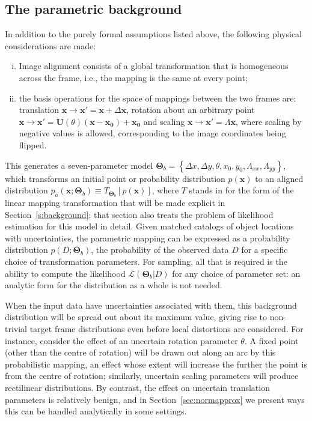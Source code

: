 \documentclass[manuscript]{aastex}
\newcommand{\bsT}{\boldsymbol\Theta}
\begin{document}
\subsection{The parametric background}\label{ss:p}
In addition to the purely formal assumptions listed above, the following physical considerations are made:
\begin{enumerate}[(i)]
\item Image alignment consists of a global transformation that is homogeneous across the frame, i.e., the mapping is the same at every point;
\item the basis operations for the space of mappings between the two frames are: translation $\mathbf{x}\rightarrow \mathbf{x}' = \mathbf{x}+\Delta\mathbf{x}$, rotation about an arbitrary point $\mathbf{x}\rightarrow \mathbf{x}' = \mathbf{U}(\theta)\left(\mathbf{x}-\mathbf{x_0}\right)+\mathbf{x_0}$ and scaling  $\mathbf{x}\rightarrow \mathbf{x}' = \Lambda\mathbf{x}$, where scaling by negative values is allowed, corresponding to the image coordinates being flipped.
\end{enumerate}
This generates a seven-parameter model $\bsT_b = \left\{\Delta x, \Delta y, \theta, x_0, y_0, \Lambda_{xx},\Lambda_{yy}\right\}$, which transforms an initial point or probability distribution $p(\mathbf{x})$ to an aligned distribution $p_a(\mathbf{x};\bsT_b) \equiv T_{\bsT_b}\left[p(\mathbf{x})\right]$, where $T$ stands in for the form of the linear mapping transformation that will be made explicit in Section~\ref{s:background}; that section also treats the problem of likelihood estimation for this model in detail. Given matched catalogs of object locations with uncertainties, the parametric mapping can be expressed as a probability distribution $p\left(D; \bsT_b\right)$, the probability of the observed data $D$ for a specific choice of transformation parameters. For sampling, all that is required is the ability to compute the likelihood $\mathcal{L}(\bsT_b|D)$ for any choice of parameter set: an analytic form for the distribution as a whole is not needed.

When the input data have uncertainties associated with them, this background distribution will be spread out about its maximum value, giving rise to non-trivial target frame distributions even before local distortions are considered. For instance, consider the effect of an uncertain rotation parameter $\theta$. A fixed point (other than the centre of rotation) will be drawn out along an arc by this probabilistic mapping, an effect whose extent will increase the further the point is from the centre of rotation; similarly, uncertain scaling parameters will produce rectilinear distributions. By contrast, the effect on uncertain translation parameters is relatively benign, and in Section~\ref{sec:normapprox} we present ways this can be handled analytically in some settings.
\end{document}
